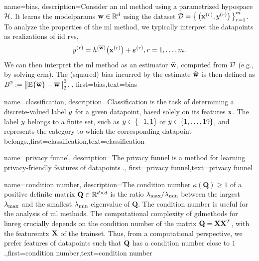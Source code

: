 {
	name={bias},
	description={Consider an \gls{ml} method using a parametrized \gls{hypospace} $\mathcal{H}$. 
		It learns the \gls{modelparams} ${\bf w} \in \mathbb{R}^{d}$ using the \gls{dataset} $\mathcal{D}=\big\{ \left( {\bf x}^{(r)},y^{(r)} \right) \big\}_{r=1}^{m}$. 
		To analyze the properties of the \gls{ml} method, we typically interpret the \gls{datapoint}s as \gls{realization}s 
		of \gls{iid} \gls{rv}s, $$ y^{(r)} = h^{(\overline{{\bf w}})}\big( {\bf x}^{(r)} \big) + \bm{\varepsilon}^{(r)}, r=1,\ldots,m.$$ 
		We can then interpret the \gls{ml} method as an estimator $\widehat{{\bf w}}$, 
		computed from $\mathcal{D}$ (e.g., by solving \gls{erm}). The (squared) bias incurred by the estimate $\widehat{{\bf w}}$ 
		is then defined as $B^{2} := \big\| \mathbb{E} \{ \widehat{{\bf w}}  \}- \overline{{\bf w}}\big\|_{2}^{2}$. },
first={bias},text={bias} 
}

{name={classification},
 description={Classification is the task of determining a 
 	discrete-valued label $y$ for a given \gls{datapoint}, based solely on its 
 	features ${\bf x}$. The label $y$ belongs to a finite set, such as 
 	$y \in \{-1,1\}$ or $y \in \{1,\ldots,19\}$, and represents the 
 	category to which the corresponding \gls{datapoint} belongs.},first={classification},text={classification} 
}



{name={privacy funnel},
 description={The privacy funnel is a method for learning privacy-friendly \gls{feature}s 
	of \gls{datapoint}s \cite{PrivacyFunnel}.},
 first={privacy funnel},text={privacy funnel} 
}




{
	name={condition number},
	description={The condition number $\kappa(\mathbf{Q}) \geq 1$ of a 
		positive definite 
		matrix $\mathbf{Q} \in \mathbb{R}^{d \times d}$ is the ratio 
		$\lambda_{\rm max} /\lambda_{\rm min}  $ between the 
		largest $\lambda_{\rm max}$ and the smallest $\lambda_{\rm min}$ \gls{eigenvalue} of 
		$\mathbf{Q}$. The condition number is useful for the analysis of \gls{ml} methods. 
		The computational complexity of \gls{gdmethods} for \gls{linreg} crucially depends on the 
		condition number of the matrix $\mathbf{Q} = {\bf X} {\bf X}^{T}$, with the \gls{featuremtx} ${\bf X}$ 
		of the \gls{trainset}. Thus, from a computational perspective, we prefer \gls{feature}s of 
		\gls{datapoint}s such that $\mathbf{Q}$ has a condition number close to $1$.},first={condition number},text={condition number} 
}

